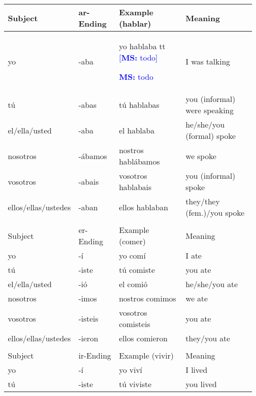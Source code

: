 \documentclass[a4paper,12pt]{article}
\newcommand*{\MS}[2][r]{\ifx t#1 \textcolor{blue}{[\textbf{MS:} #2]}
  \else \begin{center}\textcolor{blue}{\textbf{MS:} #2} \end{center} \fi}
\begin{document}
\begin{table}[H]
\centering
\begin{tabular}{llll}
  Subject             & ar-Ending & Example (hablar)   & Meaning                      \\
  \toprule
  yo                  & -aba      & yo hablaba \MS[t]{todo}         & I was talking                \\
  tú                  & -abas     & tú hablabas        & you (informal) were speaking \\
  el/ella/usted       & -aba      & el hablaba         & he/she/you (formal) spoke    \\
  nosotros            & -ábamos   & nostros hablábamos & we spoke                     \\
  vosotros            & -abais    & vosotros hablabais & you (informal) spoke         \\
  ellos/ellas/ustedes & -aban     & ellos hablaban     & they/they (fem.)/you spoke   \\
  \midrule
                      &           &                    &                              \\
  Subject             & er-Ending & Example (comer)    & Meaning                      \\
  \toprule
  yo                  & -í        & yo comí            & I ate                        \\
  tú                  & -iste     & tú comiste         & you ate                      \\
  el/ella/usted       & -ió       & el comió           & he/she/you ate               \\
  nosotros            & -imos     & nostros comimos    & we ate                       \\
  vosotros            & -isteis   & vosotros comisteis & you ate                      \\
  ellos/ellas/ustedes & -ieron    & ellos comieron     & they/you ate                 \\
  \midrule
                      &           &                    &                              \\
  Subject             & ir-Ending & Example (vivir)    & Meaning                      \\
  \toprule
  yo                  & -í        & yo viví            & I lived                      \\
  tú                  & -iste     & tú viviste         & you lived                    \\

\end{tabular}
\end{table}
\end{document}
